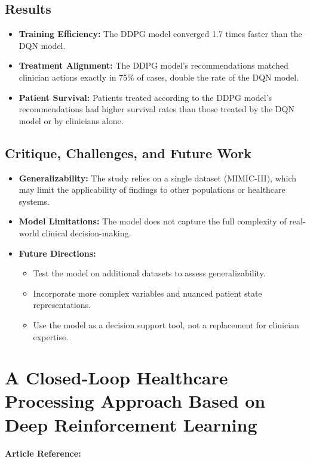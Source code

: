 \subsection*{Results}
\begin{itemize}
    \item \textbf{Training Efficiency:} The DDPG model converged 1.7 times faster than the DQN model.
    \item \textbf{Treatment Alignment:} The DDPG model's recommendations matched clinician actions exactly in 75\% of cases, double the rate of the DQN model.
    \item \textbf{Patient Survival:} Patients treated according to the DDPG model's recommendations had higher survival rates than those treated by the DQN model or by clinicians alone.
\end{itemize}

\subsection*{Critique, Challenges, and Future Work}
\begin{itemize}
    \item \textbf{Generalizability:} The study relies on a single dataset (MIMIC-III), which may limit the applicability of findings to other populations or healthcare systems.
    \item \textbf{Model Limitations:} The model does not capture the full complexity of real-world clinical decision-making.
    \item \textbf{Future Directions:}
    \begin{itemize}
        \item Test the model on additional datasets to assess generalizability.
        \item Incorporate more complex variables and nuanced patient state representations.
        \item Use the model as a decision support tool, not a replacement for clinician expertise.
    \end{itemize}
\end{itemize}

\section{A Closed-Loop Healthcare Processing Approach Based on Deep Reinforcement Learning}
\textbf{Article Reference:} \cite{daiClosedloopHealthcareProcessing2022}

